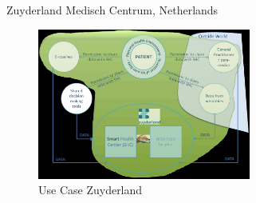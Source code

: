 
Zuyderland Medisch Centrum, Netherlands


\begin{figure}[ht!]
    \centering
    \includegraphics[width=70mm]{images/UseCaseZuyderland.jpg}
    \caption{Use Case Zuyderland}
    \label{fig:usecasezuyderland}
\end{figure}